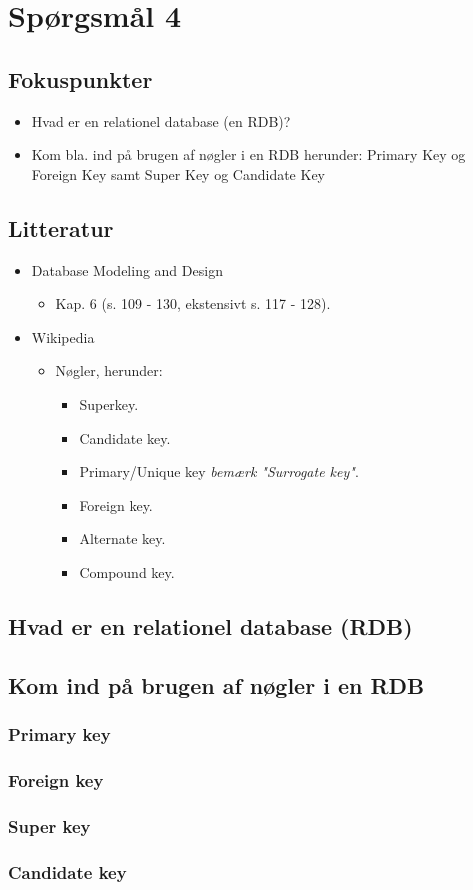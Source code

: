 \section{Spørgsmål 4}

\subsection{Fokuspunkter}
\begin{itemize}
	\item Hvad er en relationel database (en RDB)?
	\item Kom bla. ind på brugen af nøgler i en RDB herunder: Primary Key og Foreign Key samt Super Key og Candidate Key
\end{itemize}

\subsection{Litteratur}
\begin{itemize}
	\item Database Modeling and Design
	\begin{itemize}
		\item Kap. 6 (s. 109 - 130, ekstensivt s. 117 - 128).
	\end{itemize}
	\item Wikipedia
	\begin{itemize}
		\item Nøgler, herunder:
		\begin{itemize}
			\item Superkey.
			\item Candidate key.
			\item Primary/Unique key \textit{bemærk "Surrogate key"}.
			\item Foreign key.
			\item Alternate key.
			\item Compound key.
		\end{itemize}
	\end{itemize}
\end{itemize}

\newpage

\subsection{Hvad er en relationel database (RDB)}

\subsection{Kom ind på brugen af nøgler i en RDB}

\subsubsection{Primary key}

\subsubsection{Foreign key}

\subsubsection{Super key}

\subsubsection{Candidate key}